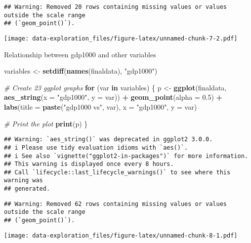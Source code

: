 \documentclass[
]{article}
\newenvironment{Shaded}{\begin{snugshade}}{\end{snugshade}}
\newcommand{\AttributeTok}[1]{\textcolor[rgb]{0.13,0.29,0.53}{#1}}
\newcommand{\CommentTok}[1]{\textcolor[rgb]{0.56,0.35,0.01}{\textit{#1}}}
\newcommand{\ControlFlowTok}[1]{\textcolor[rgb]{0.13,0.29,0.53}{\textbf{#1}}}
\newcommand{\FloatTok}[1]{\textcolor[rgb]{0.00,0.00,0.81}{#1}}
\newcommand{\FunctionTok}[1]{\textcolor[rgb]{0.13,0.29,0.53}{\textbf{#1}}}
\newcommand{\NormalTok}[1]{#1}
\newcommand{\OtherTok}[1]{\textcolor[rgb]{0.56,0.35,0.01}{#1}}
\newcommand{\SpecialCharTok}[1]{\textcolor[rgb]{0.81,0.36,0.00}{\textbf{#1}}}
\newcommand{\StringTok}[1]{\textcolor[rgb]{0.31,0.60,0.02}{#1}}
\begin{document}
\begin{verbatim}
## Warning: Removed 20 rows containing missing values or values outside the scale range
## (`geom_point()`).
\end{verbatim}

\texttt{[image: data-exploration\_files/figure-latex/unnamed-chunk-7-2.pdf]}

Relationship between gdp1000 and other variables

\begin{Shaded}
\begin{Highlighting}[]
\NormalTok{variables }\OtherTok{\textless{}{-}} \FunctionTok{setdiff}\NormalTok{(}\FunctionTok{names}\NormalTok{(finaldata), }\StringTok{"gdp1000"}\NormalTok{)}

\CommentTok{\# Create 23 ggplot graphs}
\ControlFlowTok{for}\NormalTok{ (var }\ControlFlowTok{in}\NormalTok{ variables) \{}
\NormalTok{  p }\OtherTok{\textless{}{-}} \FunctionTok{ggplot}\NormalTok{(finaldata, }\FunctionTok{aes\_string}\NormalTok{(}\AttributeTok{x =} \StringTok{"gdp1000"}\NormalTok{, }\AttributeTok{y =}\NormalTok{ var)) }\SpecialCharTok{+}
    \FunctionTok{geom\_point}\NormalTok{(}\AttributeTok{alpha =} \FloatTok{0.5}\NormalTok{) }\SpecialCharTok{+}
    \FunctionTok{labs}\NormalTok{(}\AttributeTok{title =} \FunctionTok{paste}\NormalTok{(}\StringTok{"gdp1000 vs"}\NormalTok{, var), }\AttributeTok{x =} \StringTok{"gdp1000"}\NormalTok{, }\AttributeTok{y =}\NormalTok{ var)}

  \CommentTok{\# Print the plot}
  \FunctionTok{print}\NormalTok{(p)}
\NormalTok{\}}
\end{Highlighting}
\end{Shaded}

\begin{verbatim}
## Warning: `aes_string()` was deprecated in ggplot2 3.0.0.
## i Please use tidy evaluation idioms with `aes()`.
## i See also `vignette("ggplot2-in-packages")` for more information.
## This warning is displayed once every 8 hours.
## Call `lifecycle::last_lifecycle_warnings()` to see where this warning was
## generated.
\end{verbatim}

\begin{verbatim}
## Warning: Removed 62 rows containing missing values or values outside the scale range
## (`geom_point()`).
\end{verbatim}

\texttt{[image: data-exploration\_files/figure-latex/unnamed-chunk-8-1.pdf]}
\end{document}
